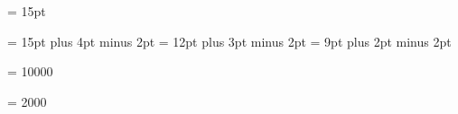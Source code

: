\begin{\parsearg\beginxxx}
\let\documentencoding = \comment


%
\newdimen{} {} = 15pt

\chapheadingskip = 15pt plus 4pt minus 2pt
\secheadingskip = 12pt plus 3pt minus 2pt
\subsecheadingskip = 9pt plus 2pt minus 2pt

\vbadness = 10000

\hbadness = 2000


%
\def\setemergencystretch{%
  \ifx\emergencystretch\thisisundefined
    \def\emergencystretch{\dimen0}%
  \else
    \emergencystretch = .15\hsize
  \fi
}

% 
%
\def\internalpagesizes#1#2#3#4#5#6#7#8{%
  \voffset = #3\relax
  \topskip = #6\relax
  \splittopskip = \topskip
  \vsize = #1\relax
  \advance\vsize by \topskip
  \outervsize = \vsize
  \advance\outervsize by 2\topandbottommargin
  \pageheight = \vsize
  \hsize = #2\relax
  \outerhsize = \hsize
  \advance\outerhsize by 0.5in
  \pagewidth = \hsize
  \normaloffset = #4\relax
  \bindingoffset = #5\relax
  \ifpdf
    \pdfpageheight #7\relax
    \pdfpagewidth #8\relax
  \fi
  \setleading{\textleading}
  \parindent = \defaultparindent
  \setemergencystretch
}

\def\letterpaper{{\globaldefs = 1
  \parskip = 3pt plus 2pt minus 1pt
  \textleading = 13.2pt
  \internalpagesizes{46\baselineskip}{6in}%
                    {\voffset}{.25in}%
                    {\bindingoffset}{36pt}%
                    {11in}{8.5in}%
}}


\end{\parsearg\beginxxx}
